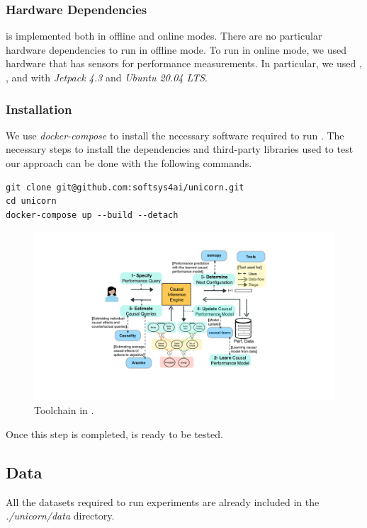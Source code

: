\subsubsection{Hardware Dependencies}
\ourtool is implemented both in offline and online modes. There are no particular hardware dependencies to run \ourtool in offline mode. To run \ourtool in online mode, we used hardware that has sensors for performance measurements. In particular, we used \txone, \txtwo, and \xavier with \emph{Jetpack 4.3} and \emph{Ubuntu 20.04 LTS}.

\subsubsection{Installation}
We use \textit{docker-compose} to install the necessary software required to run \ourtool. The necessary steps to install the dependencies and third-party libraries used to test our approach can be done with the following commands.

\begin{verbatim}
git clone git@github.com:softsys4ai/unicorn.git
cd unicorn
docker-compose up --build --detach
\end{verbatim}


\begin{figure}[hb!]
    \centering
    \includegraphics[width=\linewidth]{figures-vg/UnicornTool.pdf}
    \caption{Toolchain in \ourtool.}
    \label{fig:unicorn-toolchain}
\end{figure}

Once this step is completed, \ourtool is ready to be tested.


\subsection{Data} 
All the datasets required to run experiments are already included in the \textit{./unicorn/data} directory.  

